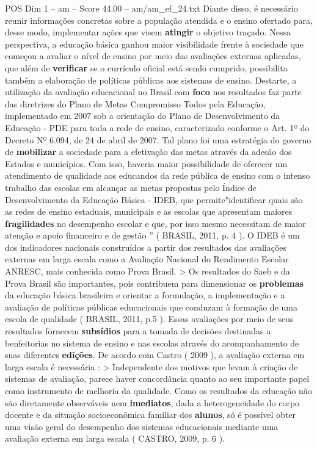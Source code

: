 \begin{textsample}{POS Dim 1 – am – Score 44.00 – am/am\_ef\_24.txt}
Diante disso, é necessário reunir informações concretas sobre a população atendida e o ensino ofertado para, desse modo, implementar ações que visem \textbf{atingir} o objetivo traçado.
Nessa perspectiva, a educação básica ganhou maior visibilidade frente à sociedade que começou a avaliar o nível de ensino por meio das avaliações externas aplicadas, que além de \textbf{verificar} se o currículo oficial está sendo cumprido, possibilita também a elaboração de políticas públicas aos sistemas de ensino.
Destarte, a utilização da avaliação educacional no Brasil com \textbf{foco} nos resultados faz parte das diretrizes do Plano de Metas Compromisso Todos pela Educação, implementado em 2007 sob a orientação do Plano de Desenvolvimento da Educação - PDE para toda a rede de ensino, caracterizado conforme o Art. 1º do Decreto Nº 6.094, de 24 de abril de 2007.
Tal plano foi uma estratégia do governo de \textbf{mobilizar} a sociedade para a efetivação das metas através da adesão dos Estados e municípios.
Com isso, haveria maior possibilidade de oferecer um atendimento de qualidade aos educandos da rede pública de ensino com o intenso trabalho das escolas em alcançar as metas propostas pelo Índice de Desenvolvimento da Educação Básica - IDEB, que permite"identificar quais são as redes de ensino estaduais, municipais e as escolas que apresentam maiores \textbf{fragilidades} no desempenho escolar e que, por isso mesmo necessitam de maior atenção e apoio financeiro e de gestão ” ( BRASIL, 2011, p. 4 ).
O IDEB é um dos indicadores nacionais construídos a partir dos resultados das avaliações externas em larga escala como a Avaliação Nacional do Rendimento Escolar ANRESC, mais conhecida como Prova Brasil. > Os resultados do Saeb e da Prova Brasil são importantes, pois contribuem para dimensionar os \textbf{problemas} da educação básica brasileira e orientar a formulação, a implementação e a avaliação de políticas públicas educacionais que conduzam à formação de uma escola de qualidade ( BRASIL, 2011, p.5 ).
Essas avaliações por meio de seus resultados fornecem \textbf{subsídios} para a tomada de decisões destinadas a benfeitorias no sistema de ensino e nas escolas através do acompanhamento de suas diferentes \textbf{edições}.
De acordo com Castro ( 2009 ), a avaliação externa em larga escala é necessária : > Independente dos motivos que levam à criação de sistemas de avaliação, parece haver concordância quanto ao seu importante papel como instrumento de melhoria da qualidade.
Como os resultados da educação não são diretamente observáveis nem \textbf{imediatos}, dada a heterogeneidade do corpo docente e da situação socioeconômica familiar dos \textbf{alunos}, só é possível obter uma visão geral do desempenho dos sistemas educacionais mediante uma avaliação externa em larga escala ( CASTRO, 2009, p. 6 ).

\end{textsample}
